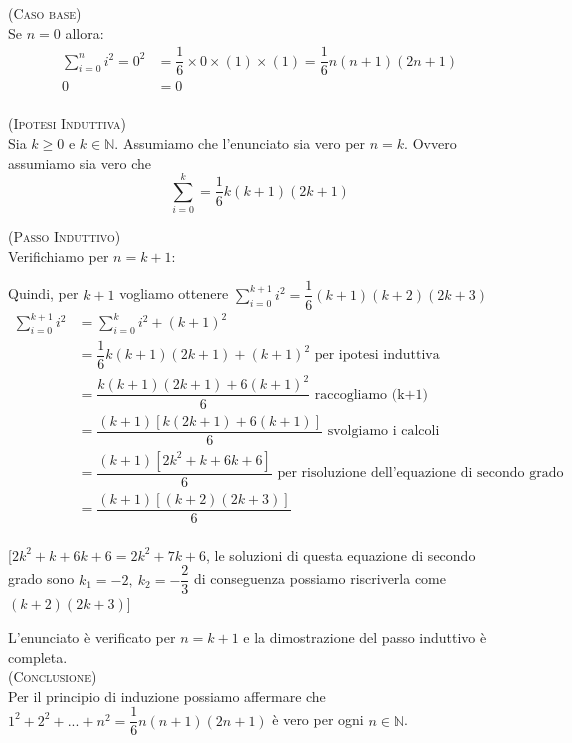 \begin{soluzione}
\textsc{(Caso base)}\\
Se $n=0$ allora:  
\begin{align*}
\sum\limits_{i=0}^n i^2  = 0^2 & = \dfrac{1}{6} \times 0 \times (1) \times (1) = \dfrac{1}{6} n (n+1) (2n+1)\\
0 & = 0\\
\end{align*}

\textsc{(Ipotesi Induttiva)}\\
Sia $k \geqslant 0$ e $k \in \mathbb{N}$. Assumiamo che l'enunciato sia vero per $n = k$. Ovvero assumiamo sia vero che
$$\sum\limits_{i=0}^k = \dfrac{1}{6} k (k+1) (2k+1)$$

\textsc{(Passo Induttivo)}\\
Verifichiamo per $n = k+1$:
        
Quindi, per $k+1$ vogliamo ottenere $\sum\limits_{i=0}^{k+1} i^2 = \dfrac{1}{6}(k+1)(k+2)(2k+3)$
\begin{align*}
\sum\limits_{i=0}^{k+1} i^2 & = \sum\limits_{i=0}^{k} i^2 + (k+1)^2\\
& = \dfrac{1}{6} k (k+1) (2k+1) + (k+1)^2  \text{ per ipotesi induttiva}\\
& = \dfrac{k(k+1)(2k+1) + 6(k+1)^2}{6}     \text{ raccogliamo (k+1)}\\
& = \dfrac{(k+1)[k(2k+1) + 6(k+1)]}{6}     \text{ svolgiamo i calcoli}\\
& = \dfrac{(k+1)[2k^2 + k + 6k + 6]}{6}    \text{ per risoluzione dell'equazione di secondo grado}\\
& = \dfrac{(k+1)[(k+2)(2k+3)]}{6} \\
\end{align*}	

[$2k^2 + k + 6k + 6 = 2k^2+7k+6$, le soluzioni di questa equazione di secondo grado sono $k_1=-2,\ k_2=-\dfrac{2}{3}$ di conseguenza possiamo riscriverla come $(k+2)(2k+3)$]		

L'enunciato è verificato per $n = k+1$ e la dimostrazione del passo induttivo è completa.\\

\textsc{(Conclusione)}\\
Per il principio di induzione possiamo affermare che $1^2 + 2^2 + ... + n^2 = \dfrac{1}{6} n (n+1) (2n+1)$ è vero per ogni $n \in \mathbb{N}$. \\
\end{soluzione}


